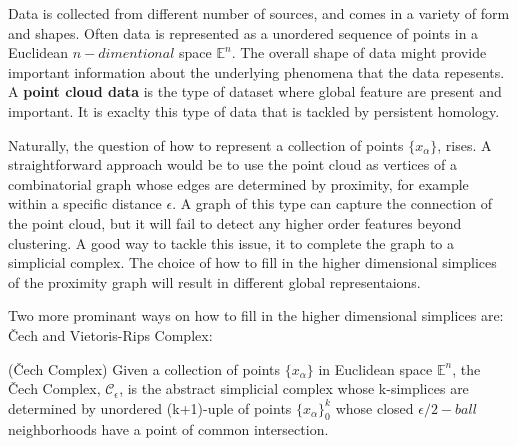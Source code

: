 \documentclass[11pt,a4paper]{report}
\begin{document}
              Data is collected from different number of sources, and comes in a variety of form and shapes. Often data is represented as a unordered sequence of points in a Euclidean $n-dimentional$ space $\mathbb{E}^n$. The overall shape of data might provide important information about the underlying phenomena that
              the data repesents. A \textbf{point cloud data} is the type of dataset where global feature are present and important. It is exaclty this type of data that is tackled by persistent homology. \cite{Ghrist_2007}
              
              Naturally, the question of how to represent a collection of points $\{x_\alpha\}$, rises. 
              A straightforward approach would be to use the point cloud as vertices of a combinatorial graph whose
              edges are determined by proximity, for example within a specific distance $\epsilon$. A graph of this type can capture the connection of the point cloud,
              but it will fail to detect any higher order features beyond clustering. 
              A good way to tackle this issue, it to complete the graph to a simplicial complex. The choice of how to fill in the higher dimensional simplices of the proximity graph will result in different global representaions. 
              
              Two more prominant ways on how to fill in the higher dimensional simplices are:  \v{C}ech and Vietoris-Rips Complex: 
              
              \begin{defn} \label{cech} (\v{C}ech Complex)
           Given a collection of points $\{x_\alpha\}$ in Euclidean space $\mathbb{E}^n$, the \v{C}ech Complex, $\mathcal{C}_\epsilon$, is the abstract simplicial complex whose k-simplices are determined by unordered (k+1)-uple of points $\{x_\alpha\}_0^k$ whose closed $\epsilon/2-ball$ neighborhoods have a point of common intersection. 
              \end{defn}
           
\end{document}
